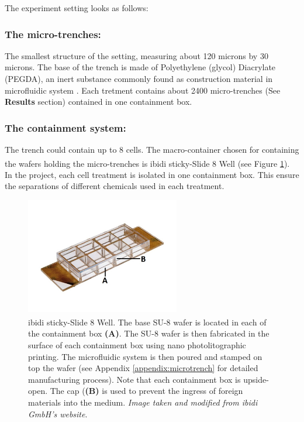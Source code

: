 \documentclass[pdftex,12pt,a4paper]{report}
\begin{document}
The experiment setting looks as follows:

\subsubsection*{The micro-trenches:}

The smallest structure of the setting, measuring about 120 microns by 30 microns. The base of the trench is made of Polyethylene (glycol) Diacrylate (PEGDA), an inert substance commonly found as construction material in microfluidic system \cite{sekhavati2015marker}. Each tretment contains about 2400 micro-trenches (See \textbf{Results} section) contained in one containment box.

\subsubsection*{The containment system:}

The trench could contain up to 8 cells. The macro-container chosen for containing the wafers holding the micro-trenches is ibidi\textsuperscript{\textregistered} sticky-Slide 8 Well (see Figure \ref{fig:ibidi}). In the project, each cell treatment is isolated in one containment box. This ensure the separations of different chemicals used in each treatment. 

\begin{figure}[H]
\centering
\includegraphics[width=0.6\textwidth]{images/sticky-slide-8-well-marked}
\caption{ibidi\textsuperscript{\textregistered} sticky-Slide 8 Well. The base SU-8 wafer is located in each of the containment box \textbf{(A)}. The SU-8 wafer is then fabricated in the surface of each containment box using nano photolitographic printing. The microfluidic system is then poured and stamped on top the wafer (see Appendix \ref{appendix:microtrench} for detailed manufacturing process). Note that each containment box is upside-open. The cap (\textbf{(B)} is used to prevent the ingress of foreign materials into the medium. \textit{Image taken and modified from ibidi GmbH's website}.}
\label{fig:ibidi}
\end{figure}
\end{document}
